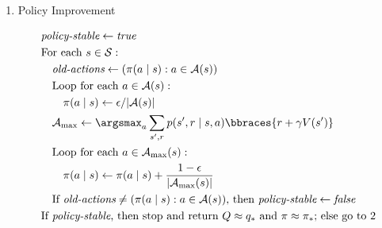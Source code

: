 \begin{solution}
\begin{tcolorbox}[title = Policy Iteration (using iterative policy evaluation) for estimating $\pi \approx \pi_\ast$]
\begin{enumerate}[label = \arabic*.]
        \item Policy Improvement

        \begin{align*}
            & \textit{policy-stable} \leftarrow \textit{true} \\
            & \text{For each $s \in \mathcal S$}: \\
            & \quad \textit{old-actions} \leftarrow (\pi(a \mid s): a \in \mathcal A(s)) \\
            & \quad \text{Loop for each $a \in \mathcal A(s)$}: \\
            & \quad \quad \pi(a \mid s) \leftarrow \epsilon / |\mathcal A(s)| \\
            & \quad \mathcal A_\text{max} \leftarrow \argsmax_a \sum_{s^\prime, r} p(s^\prime, r \mid s, a) \bbraces{r + \gamma V(s^\prime)} \\
            & \quad \text{Loop for each $a \in \mathcal A_\text{max}(s)$}: \\
            & \quad \quad \pi(a \mid s) \leftarrow \pi(a \mid s) + \frac{1 - \epsilon}{|\mathcal A_\text{max}(s)|} \\
            & \quad \text{If $\textit{old-actions} \neq (\pi(a \mid s): a \in \mathcal A(s))$, then $\textit{policy-stable} \leftarrow \textit{false}$} \\
            & \text{If $\textit{policy-stable}$, then stop and return $Q \approx q_\ast$ and $\pi \approx \pi_\ast$; else go to $2$}
        \end{align*}

    \end{enumerate}

\end{tcolorbox}

\end{solution}

